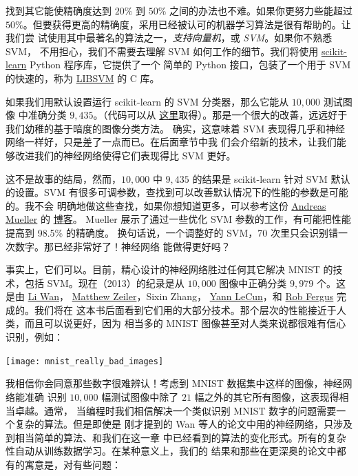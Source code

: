 找到其它能使精确度达到 $20\%$ 到 $50\%$ 之间的办法也不难。如果你更努力些能超过
$50\%$。但要获得更高的精确度，采用已经被认可的机器学习算法是很有帮助的。让我们尝
试使用其中最著名的算法之一，\emph{支持向量机}，或 \emph{SVM}。如果你不熟悉 SVM，
不用担心，我们不需要去理解 SVM 如何工作的细节。我们将使用
\href{http://scikit-learn.org/stable/}{scikit-learn} Python 程序库，它提供了一个
简单的 Python 接口，包装了一个用于 SVM 的快速的，称为
\href{http://www.csie.ntu.edu.tw/~cjlin/libsvm/}{LIBSVM} 的 C 库。

如果我们用默认设置运行 scikit-learn 的 SVM 分类器，那么它能从 $10,000$ 测试图像
中准确分类 $9,435$。（代码可以从%
  \href{https://github.com/mnielsen/neural-networks-and-deep-learning/blob/master/src/mnist_svm.py}{
    这里}取得）。那是一个很大的改善，远远好于我们幼稚的基于暗度的图像分类方法。
确实，这意味着 SVM 表现得几乎和神经网络一样好，只是差了一点而已。在后面章节中我
们会介绍新的技术，让我们能够改进我们的神经网络使得它们表现得比 SVM 更好。

这不是故事的结局，然而，$10,000$ 中 $9,435$ 的结果是 scikit-learn 针对 SVM 默认
的设置。SVM 有很多可调参数，查找到可以改善默认情况下的性能的参数是可能的。我不会
明确地做这些查找，如果你想知道更多，可以参考这份
\href{http://peekaboo-vision.blogspot.ca/}{Andreas Mueller} 的%
\href{http://peekaboo-vision.blogspot.de/2010/09/mnist-for-ever.html}{博客}。
Mueller 展示了通过一些优化 SVM 参数的工作，有可能把性能提高到 98.5\% 的精确度。
换句话说，一个调整好的 SVM，70 次里只会识别错一次数字。那已经非常好了！神经网络
能做得更好吗？

事实上，它们可以。目前，精心设计的神经网络胜过任何其它解决 MNIST 的技术，包括
SVM。现在（2013）的纪录是从 $10,000$ 图像中正确分类 $9,979$ 个。这是由
\href{http://www.cs.nyu.edu/~wanli/}{Li Wan}，
\href{http://www.matthewzeiler.com/}{Matthew Zeiler}，Sixin Zhang，
\href{http://yann.lecun.com/}{Yann LeCun}，和
\href{http://cs.nyu.edu/~fergus/pmwiki/pmwiki.php}{Rob Fergus} 完成的。我们将在
这本书后面看到它们用的大部分技术。那个层次的性能接近于人类，而且可以说更好，因为
相当多的 MNIST 图像甚至对人类来说都很难有信心识别，例如：
\begin{center}
  \texttt{[image: mnist\_really\_bad\_images]}
\end{center}

我相信你会同意那些数字很难辨认！考虑到 MNIST 数据集中这样的图像，神经网络能准确
识别 $10,000$ 幅测试图像中除了 $21$ 幅之外的其它所有图像，这表现得相当卓越。通常，
当编程时我们相信解决一个类似识别 MNIST 数字的问题需要一个复杂的算法。但是即使是
刚才提到的 Wan 等人的论文中用的神经网络，只涉及到相当简单的算法、和我们在这一章
中已经看到的算法的变化形式。所有的复杂性自动从训练数据学习。在某种意义上，我们的
结果和那些在更深奥的论文中都有的寓意是，对有些问题：

